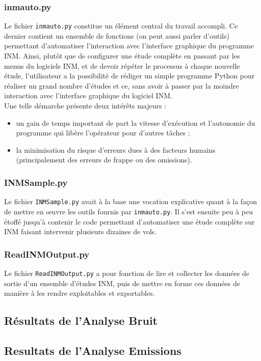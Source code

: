 \documentclass[a4paper,12pt,twoside]{article}
\newcommand{\code}[1]{\texttt{#1}}
\begin{document}
    \subsubsection*{inmauto.py}
    Le fichier \code{inmauto.py} constitue un élément central du travail accompli. Ce dernier contient un ensemble de fonctions (on peut aussi parler d'outils) permettant d'automatiser l'interaction avec l'interface graphique du programme INM. Ainsi, plutôt que de configurer une étude complète en passant par les menus du logiciels INM, et de devoir répéter le processus à chaque nouvelle étude, l'utilisateur a la possibilité de rédiger un simple programme Python pour réaliser un grand nombre d'études et ce, sans avoir à passer par la moindre interaction avec l'interface graphique du logiciel INM.\\
    Une telle démarche présente deux intérêts majeurs :
    \begin{itemize}
        \item un gain de temps important de part la vitesse d'exécution et l'autonomie du programme qui libère l'opérateur pour d'autres tâches ;
        \item la minimisation du risque d'erreurs dues à des facteurs humains (principalement des erreurs de frappe ou des omissions).
    \end{itemize}
    \subsubsection*{INMSample.py}
    Le fichier \code{INMSample.py} avait à la base une vocation explicative quant à la façon de mettre en \oe uvre les outils fournis par \code{inmauto.py}. Il s'est ensuite peu à peu étoffé jusqu'à contenir le code permettant d'automatiser une étude complète sur INM faisant intervenir plusieurs dizaines de vols.
    \subsubsection*{ReadINMOutput.py}
    Le fichier \code{ReadINMOutput.py} a pour fonction de lire et collecter les données de sortie d'un ensemble d'études INM, puis de mettre en forme ces données de manière à les rendre exploitables et exportables.
    \subsection{Résultats de l'Analyse Bruit}
    \subsection{Resultats de l'Analyse Emissions}
\end{document}
